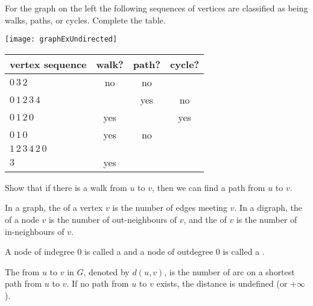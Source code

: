 \begin{Boxample}
For the graph on the left the following
sequences of vertices are classified as being walks, paths, or cycles. Complete the table.\\

\begin{minipage}[c]{0.3\textwidth}
\centering
\texttt{[image: graphExUndirected]}
\end{minipage}
\begin{minipage}[c]{0.65\textwidth}
\begin{tabular}{|l|c|c|c|}\hline
\textbf{vertex sequence} & \textbf{walk?} & \textbf{path?} & \textbf{cycle?} \\ \hline
$0\, 3\, 2$                  & no  & no  &   \\
$0\, 1\, 2\, 3\, 4$          &     & yes & no  \\
$0\, 1\,  2\,  0$            & yes &     & yes  \\
$0 \, 1\,  0$                & yes & no  &  \\
$1\,  2\,  3\,  4\,  2\,  0$ &     &     &  \\
$3$							 & yes &     &  \\
\hline
\end{tabular}
\end{minipage}
\end{Boxample}

\begin{Boxample}[7]
Show that if there is a walk from $u$ to $v$, then we can find a path from $u$ to $v$.
\end{Boxample}

\begin{Definition} 
In a graph, the  of a vertex $v$ is the number of edges meeting $v$. 
In a digraph, the  of a node $v$ is the number of out-neighbours of $v$, 
and the  of $v$ is the number of in-neighbours of $v$.

A node of indegree $0$ is called a  and a node of outdegree $0$ is called a .
\end{Definition}


\begin{Definition}
The  from $u$ to $v$ in $G$, denoted by $d(u,v)$, is 
the number of arc on a shortest path from $u$ to $v$. If no path from $u$ to $v$ exists, the 
distance is undefined (or $+\infty$).
\end{Definition}

